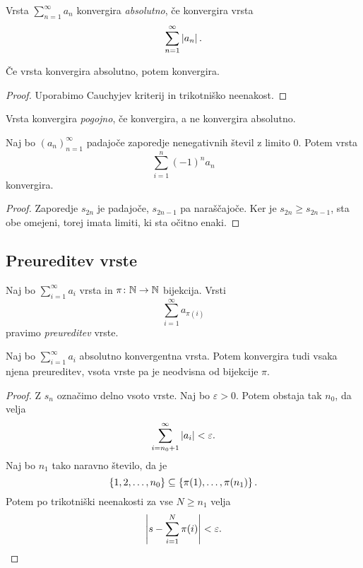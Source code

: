\documentclass[12pt, a4paper]{article}
\begin{document}
\begin{definicija}
Vrsta $\displaystyle\sum_{n=1}^\infty a_n$ konvergira \emph{absolutno}, če konvergira vrsta
\[
\sum_{n=1}^\infty \left\lvert a_n\right\rvert.
\]
\end{definicija}

\begin{trditev}
Če vrsta konvergira absolutno, potem konvergira.
\end{trditev}

\begin{proof}
Uporabimo Cauchyjev kriterij in trikotniško neenakost.
\end{proof}

\begin{definicija}
Vrsta konvergira \emph{pogojno}, če konvergira, a ne konvergira absolutno.
\end{definicija}

\begin{izrek}
Naj bo $(a_n)_{n=1}^\infty$ padajoče zaporedje nenegativnih števil z limito $0$. Potem vrsta
\[
\sum_{i=1}^n (-1)^n a_n
\]
konvergira.
\end{izrek}

\begin{proof}
Zaporedje $s_{2n}$ je padajoče, $s_{2n-1}$ pa naraščajoče. Ker je $s_{2n}\geq s_{2n-1}$, sta obe omejeni, torej imata limiti, ki sta očitno enaki.
\end{proof}

\newpage

\subsection{Preureditev vrste}

\begin{definicija}
Naj bo $\displaystyle\sum_{i=1}^\infty a_i$ vrsta in $\pi\colon\mathbb{N}\to\mathbb{N}$ bijekcija. Vrsti
\[
\sum_{i=1}^\infty a_{\pi(i)}
\]
pravimo \emph{preureditev} vrste. 
\end{definicija}

\begin{izrek}
Naj bo $\displaystyle\sum_{i=1}^\infty a_i$ absolutno konvergentna vrsta. Potem konvergira tudi vsaka njena preureditev, vsota vrste pa je neodvisna od bijekcije $\pi$.
\end{izrek}

\begin{proof}
Z $s_n$ označimo delno vsoto vrste. Naj bo $\varepsilon>0$. Potem obstaja tak $n_0$, da velja
\[
\sum_{i=n_0+1}^\infty\left\lvert a_i\right\rvert<\varepsilon.
\]
Naj bo $n_1$ tako naravno število, da je
\[
\left\{1,2,\dots,n_0\right\}\subseteq\left\{\pi(1),\dots,\pi(n_1)\right\}.
\]
Potem po trikotniški neenakosti za vse $N\geq n_1$ velja
\[
\left\lvert s-\sum_{i=1}^{N}\pi(i)\right\rvert<\varepsilon.\qedhere
\]
\end{proof}
\end{document}
